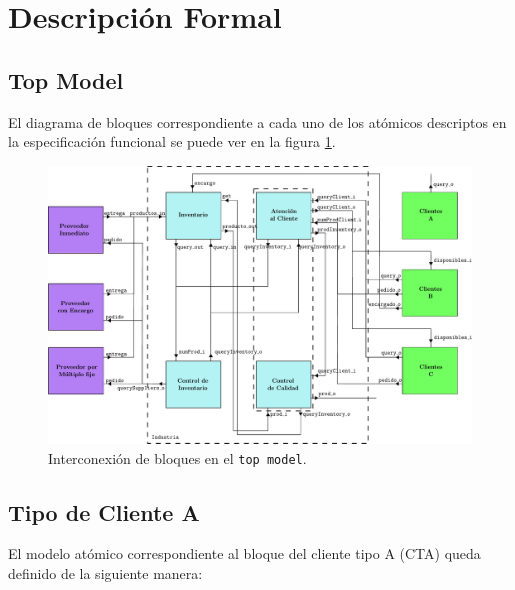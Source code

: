 \documentclass[10pt]{article}
\begin{document}
\section{Descripción Formal}

\subsection{Top Model\label{sec:TM}}
El diagrama de bloques correspondiente a cada uno de los atómicos descriptos en la especificación funcional se puede ver en la figura \ref{fig:TM-esquematico}. 

\begin{figure}[htbp]
	\centering
	\includegraphics[angle=-90, scale=0.7]{img/bloquestopmodel}
	\caption{Interconexión de bloques en el \texttt{top model}.}
	\label{fig:TM-esquematico}
\end{figure}


\subsection{Tipo de Cliente A\label{sec:CTA}}

El modelo atómico correspondiente al bloque del cliente tipo A (CTA) queda definido de la siguiente manera:

\\
\end{document}
